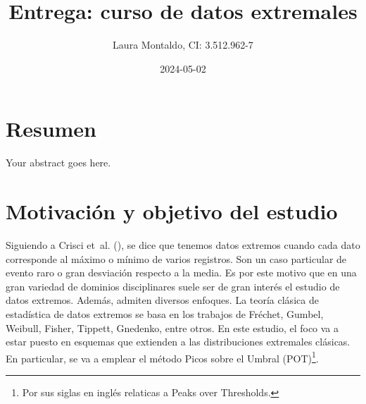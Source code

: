 \documentclass[
  12pt]{article}
\title{Entrega: curso de datos extremales}
\author{Laura Montaldo, CI: 3.512.962-7}
\date{2024-05-02}
\begin{document}
\maketitle

\newtheorem{theorem}{Teorema}
\newtheorem{mydefinition}{Definición}
\newtheorem{observation}{Observación}
\newtheorem{Corolario}{Corolario}

\newpage

\thispagestyle{empty}

\maketitle

\newpage

\tableofcontents

\newpage

\section{Resumen}\label{resumen}

Your abstract goes here.

\newpage

\section{Motivación y objetivo del
estudio}\label{motivaciuxf3n-y-objetivo-del-estudio}

Siguiendo a Crisci et~al. (), se dice
que tenemos datos extremos cuando cada dato corresponde al máximo o
mínimo de varios registros. Son un caso particular de evento raro o gran
desviación respecto a la media. Es por este motivo que en una gran
variedad de dominios disciplinares suele ser de gran interés el estudio
de datos extremos. Además, admiten diversos enfoques. La teoría clásica
de estadística de datos extremos se basa en los trabajos de Fréchet,
Gumbel, Weibull, Fisher, Tippett, Gnedenko, entre otros. En este
estudio, el foco va a estar puesto en esquemas que extienden a las
distribuciones extremales clásicas. En particular, se va a emplear el
método Picos sobre el Umbral
(POT)\footnote{Por sus siglas en inglés relaticas a  Peaks over Thresholds.}.
\end{document}
